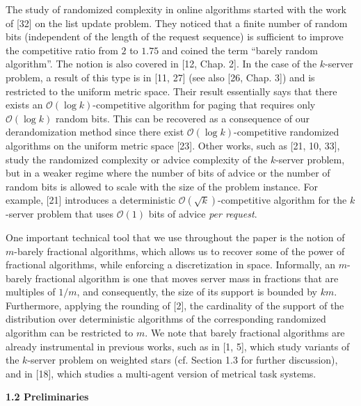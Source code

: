 \documentclass[10pt,a4paper]{article}
\begin{document}
The study of randomized complexity in online algorithms started with the work of [32] on the list update problem. They noticed that a finite number of random bits (independent of the length of the request sequence) is sufficient to improve the competitive ratio from $2$ to $1.75$ and coined the term “barely random algorithm”. The notion is also covered in [12, Chap. 2]. In the case of the $k$-server problem, a result of this type is in [11, 27] (see also [26, Chap. 3]) and is restricted to the uniform metric space. Their result essentially says that there exists an $\mathcal{O}(\log k)$-competitive algorithm for paging that requires only $\mathcal{O}(\log k)$ random bits. This can be recovered as a consequence of our derandomization method since there exist $\mathcal{O}(\log k)$-competitive randomized algorithms on the uniform metric space [23]. Other works, such as [21, 10, 33], study the randomized complexity or advice complexity of the $k$-server problem, but in a weaker regime where the number of bits of advice or the number of random bits is allowed to scale with the size of the problem instance. For example, [21] introduces a deterministic $\mathcal{O}(\sqrt{k})$-competitive algorithm for the $k$-server problem that uses $\mathcal{O}(1)$ bits of advice \emph{per request}.\par




One important technical tool that we use throughout the paper is the notion of $m$-barely fractional algorithms, which allows us to recover some of the power of fractional algorithms, while enforcing a discretization in space. Informally, an $m$-barely fractional algorithm is one that moves server mass in fractions that are multiples of $1/m$, and consequently, the size of its support is bounded by $km$. Furthermore, applying the rounding of [2], the cardinality of the support of the distribution over deterministic algorithms of the corresponding randomized algorithm can be restricted to $m$. We note that barely fractional algorithms are already instrumental in previous works, such as in [1, 5], which study variants of the $k$-server problem on weighted stars (cf. Section 1.3 for further discussion), and in [18], which studies a multi-agent version of metrical task systems.\par





\par\medskip\noindent\textbf{
1.2 Preliminaries}\par
\end{document}
